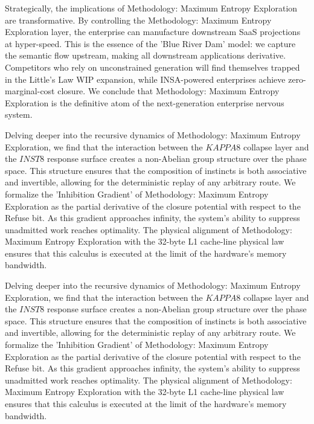 \documentclass[12pt,a4paper,oneside]{book}
\begin{document}
Strategically, the implications of Methodology: Maximum Entropy Exploration are transformative. By controlling the Methodology: Maximum Entropy Exploration layer, the enterprise can manufacture downstream SaaS projections at hyper-speed. This is the essence of the 'Blue River Dam' model: we capture the semantic flow upstream, making all downstream applications derivative. Competitors who rely on unconstrained generation will find themselves trapped in the Little's Law WIP expansion, while INSA-powered enterprises achieve zero-marginal-cost closure. We conclude that Methodology: Maximum Entropy Exploration is the definitive atom of the next-generation enterprise nervous system. 

Delving deeper into the recursive dynamics of Methodology: Maximum Entropy Exploration, we find that the interaction between the $KAPPA8$ collapse layer and the $INST8$ response surface creates a non-Abelian group structure over the phase space. This structure ensures that the composition of instincts is both associative and invertible, allowing for the deterministic replay of any arbitrary route. We formalize the 'Inhibition Gradient' of Methodology: Maximum Entropy Exploration as the partial derivative of the closure potential with respect to the Refuse bit. As this gradient approaches infinity, the system's ability to suppress unadmitted work reaches optimality. The physical alignment of Methodology: Maximum Entropy Exploration with the 32-byte L1 cache-line physical law ensures that this calculus is executed at the limit of the hardware's memory bandwidth. 

Delving deeper into the recursive dynamics of Methodology: Maximum Entropy Exploration, we find that the interaction between the $KAPPA8$ collapse layer and the $INST8$ response surface creates a non-Abelian group structure over the phase space. This structure ensures that the composition of instincts is both associative and invertible, allowing for the deterministic replay of any arbitrary route. We formalize the 'Inhibition Gradient' of Methodology: Maximum Entropy Exploration as the partial derivative of the closure potential with respect to the Refuse bit. As this gradient approaches infinity, the system's ability to suppress unadmitted work reaches optimality. The physical alignment of Methodology: Maximum Entropy Exploration with the 32-byte L1 cache-line physical law ensures that this calculus is executed at the limit of the hardware's memory bandwidth. 
\end{document}
